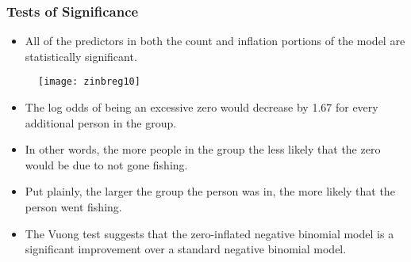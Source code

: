 \documentclass[MASTER.tex]{subfiles}
\begin{document}
\begin{frame}[fragile]
\frametitle{Tests of Significance}
\begin{itemize}
\item	All of the predictors in both the count and inflation portions of the model are statistically significant. 
\end{itemize}	

\end{frame}
%	
%	
%	
\begin{frame}
	\begin{figure}
		\centering
		\texttt{[image: zinbreg10]}
		
	\end{figure}
	
	
\end{frame}
\begin{frame}
	\begin{itemize}
		\item The log odds of being an excessive zero would decrease by 1.67 for every additional person in the group. 
		\item In other words, the more people in the group the less likely that the zero would be due to not gone fishing. 
		\item Put plainly, the larger the group the person was in, the more likely that the person went fishing.
		\item The Vuong test suggests that the zero-inflated negative binomial model is a significant improvement over a standard negative binomial model. 
	\end{itemize}
\end{frame}
\end{document}
